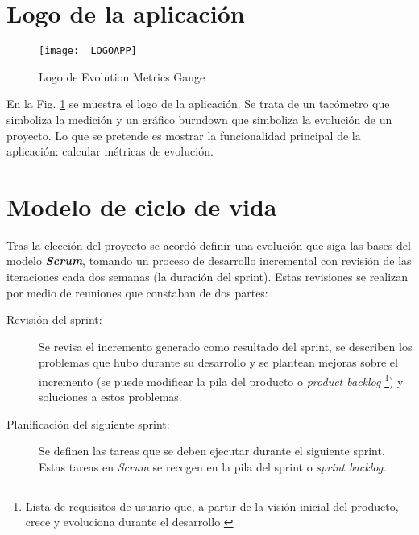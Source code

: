 \section{Logo de la aplicación}

\begin{figure}[!h]
	\centering
	\texttt{[image: \_LOGOAPP]}
	\caption{Logo de Evolution Metrics Gauge}\label{fig:_LOGOAPP}
\end{figure}
\FloatBarrier

En la Fig. \ref{fig:_LOGOAPP} se muestra el logo de la aplicación. Se trata de un tacómetro que simboliza la medición y un gráfico burndown que simboliza la evolución de un proyecto. Lo que se pretende es mostrar la funcionalidad principal de la aplicación: calcular métricas de evolución.

\section{Modelo de ciclo de vida}

Tras la elección del proyecto se acordó definir una evolución que siga las bases del modelo \textit{\textbf{Scrum}}, tomando un proceso de desarrollo incremental con revisión de las iteraciones cada dos semanas (la duración del sprint). Estas revisiones se realizan por medio de reuniones que constaban de dos partes:
\begin{description}
	\item [Revisión del sprint:] Se revisa el incremento generado como resultado del sprint, se describen los problemas que hubo durante su desarrollo y se plantean mejoras sobre el incremento (se puede modificar la pila del producto o \textit{product backlog} \footnote{Lista de requisitos de usuario que, a partir de la visión inicial del producto, crece y evoluciona durante el desarrollo \citep{scrum_master_scrum_2019}}) y soluciones a estos problemas.
	\item [Planificación del siguiente sprint:] Se definen las tareas que se deben ejecutar durante el siguiente sprint. Estas tareas en \textit{Scrum} se recogen en la pila del sprint o \textit{sprint backlog}.
\end{description}


